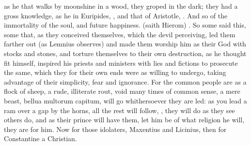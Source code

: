 {as he that walks by moonshine in a wood, they groped in the dark; they
had a gross knowledge, as he in Euripides, , and that of Aristotle, . And so of the immortality of the soul, and future
happiness.  (saith Hierom) . So some
said this, some that, as they conceived themselves, which the devil
perceiving, led them farther out (as Lemnius observes) and made
them worship him as their God with stocks and stones, and torture
themselves to their own destruction, as he thought fit himself,
inspired his priests and ministers with lies and fictions to prosecute
the same, which they for their own ends were as willing to undergo,
taking advantage of their simplicity, fear and ignorance. For the
common people are as a flock of sheep, a rude, illiterate rout, void
many times of common sense, a mere beast, bellua multorum capitum, will
go whithersoever they are led: as you lead a ram over a gap by the
horns, all the rest will follow, ,
they will do as they see others do, and as their prince will have them,
let him be of what religion he will, they are for him. Now for those
idolaters, Maxentius and Licinius, then for Constantine a Christian.

}
